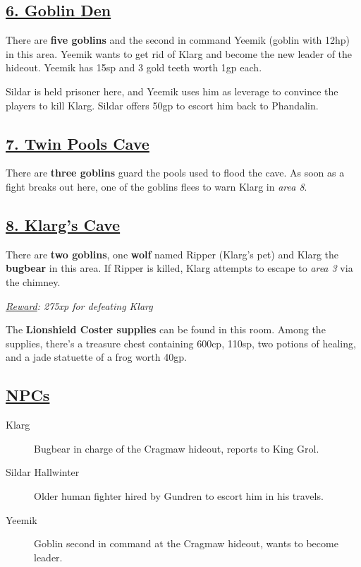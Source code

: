 \subsection*{\underline{6. Goblin Den}}
There are \textbf{five goblins} and the second in command Yeemik (goblin with 12hp) in this area. Yeemik wants to get rid of Klarg and become the new leader of the hideout. Yeemik has 15sp and 3 gold teeth worth 1gp each. 

Sildar is held prisoner here, and Yeemik uses him as leverage to convince the players to kill Klarg. Sildar offers 50gp to escort him back to Phandalin.

\subsection*{\underline{7. Twin Pools Cave}}
There are \textbf{three goblins} guard the pools used to flood the cave. As soon as a fight breaks out here, one of the goblins flees to warn Klarg in \emph{area 8}.

\subsection*{\underline{8. Klarg's Cave}}
There are \textbf{two goblins}, one \textbf{wolf} named Ripper (Klarg's pet) and Klarg the \textbf{bugbear} in this area. If Ripper is killed, Klarg attempts to escape to \emph{area 3} via the chimney.

\emph{\underline{Reward}: 275xp for defeating Klarg} 

The \textbf{Lionshield Coster supplies} can be found in this room. Among the supplies, there's a treasure chest containing 600cp, 110sp, two potions of healing, and a jade statuette of a frog worth 40gp.

\subsection*{\underline{NPCs}}
\begin{description}
	\item[Klarg] Bugbear in charge of the Cragmaw hideout, reports to King Grol.
	\item[Sildar Hallwinter] Older human fighter hired by Gundren to escort him in his travels.
	\item[Yeemik] Goblin second in command at the Cragmaw hideout, wants to become leader.
\end{description}


\vfill
